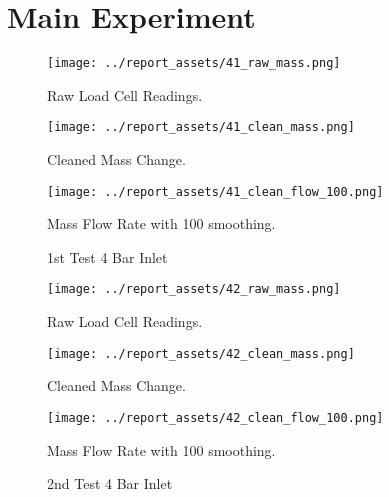 \section{Main Experiment}
\begin{figure}[htbp]
    \centering

    \begin{minipage}{0.3\textwidth}
        \centering
        \texttt{[image: ../report\_assets/41\_raw\_mass.png]}
        \caption*{Raw Load Cell Readings.}
    \end{minipage}
    \hfill
    \begin{minipage}{0.3\textwidth}
        \centering
        \texttt{[image: ../report\_assets/41\_clean\_mass.png]}
        \caption*{Cleaned Mass Change.}
    \end{minipage}
    \hfill
    \begin{minipage}{0.3\textwidth}
        \centering
        \texttt{[image: ../report\_assets/41\_clean\_flow\_100.png]}
        \caption*{Mass Flow Rate with 100 smoothing.}
    \end{minipage}
    \caption{1st Test 4 Bar Inlet}

\end{figure}\label{fig:41}

\begin{figure}[htbp]
    \centering

    \begin{minipage}{0.3\textwidth}
        \centering
        \texttt{[image: ../report\_assets/42\_raw\_mass.png]}
        \caption*{Raw Load Cell Readings.}
    \end{minipage}
    \hfill
    \begin{minipage}{0.3\textwidth}
        \centering
        \texttt{[image: ../report\_assets/42\_clean\_mass.png]}
        \caption*{Cleaned Mass Change.}
    \end{minipage}
    \hfill
    \begin{minipage}{0.3\textwidth}
        \centering
        \texttt{[image: ../report\_assets/42\_clean\_flow\_100.png]}
        \caption*{Mass Flow Rate with 100 smoothing.}
    \end{minipage}
    \caption{2nd Test 4 Bar Inlet}
    
\end{figure}\label{fig:42}

